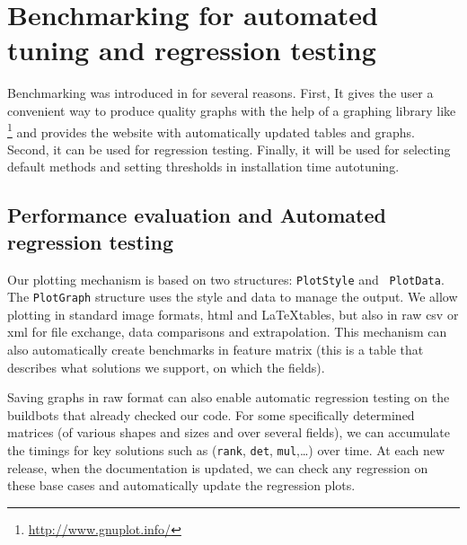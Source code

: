 \section{Benchmarking  for automated tuning and regression testing}\label{sec:bench}
%
Benchmarking was introduced in \linbox for several reasons. First, It
gives the user a convenient way to produce quality graphs with the
help
of a graphing library like \gnuplot
\footnote{\url{http://www.gnuplot.info/}}
%
and provides the \linbox website with automatically updated tables and graphs.
Second, it can be used for regression testing.  Finally, it will be used for
selecting default methods and setting thresholds in installation time autotuning. %
%
\par
%
%
%
\subsection{Performance evaluation and Automated regression testing}
%
Our plotting mechanism is based on two structures: {\tt PlotStyle} and {\tt
PlotData}. The  {\tt PlotGraph} structure uses the style and data to manage the
output.  We allow plotting in standard image formats, html and \LaTeX tables,
but also in raw csv or xml for file exchange, data comparisons and
extrapolation.
This mechanism can also automatically create benchmarks in \linbox
feature matrix (this is a table that describes what solutions we support, on
which the fields).
%
\par
%
% 
%
%
%
Saving graphs in raw format can also enable automatic regression testing on the
buildbots that already checked our code. For some specifically determined matrices (of
various shapes and sizes and over several fields), we can accumulate the timings
for key solutions such as ({\tt rank}, {\tt det}, {\tt mul},\ldots) over time.
At each new release, when the documentation is updated, we can check any
regression on these base cases and automatically update the regression plots.
%

